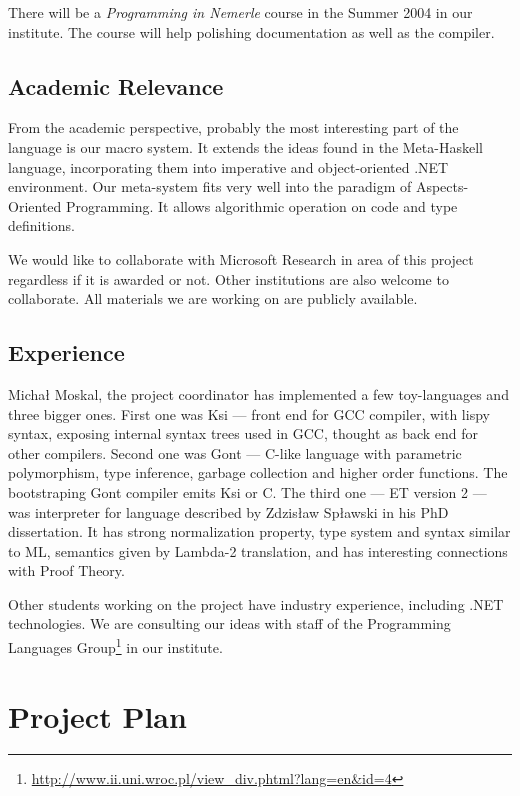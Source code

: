 \documentclass[a4paper,11pt]{article}
\begin{document}
There will be a \textit{Programming in Nemerle} course in the Summer
2004 in our institute.  The course will help polishing documentation as
well as the compiler.


\subsection{Academic Relevance}

From the academic perspective, probably the most interesting part of
the language is our macro system. It extends the ideas found in the
Meta-Haskell \cite{MetaHaskell} language, incorporating them into
imperative and object-oriented .NET environment. Our meta-system fits
very well into the paradigm of Aspects-Oriented Programming. It allows
algorithmic operation on code and type definitions.

We would like to collaborate with Microsoft Research in area of this
project regardless if it is awarded or not. Other institutions are also
welcome to collaborate. All materials we are working on are publicly
available.



\subsection{Experience}

Micha{\l} Moskal, the project coordinator has implemented a few
toy-languages and three bigger ones. First one was Ksi --- front end for
GCC compiler, with lispy syntax, exposing internal syntax trees used in
GCC, thought as back end for other compilers.  Second one was Gont ---
C-like language with parametric polymorphism, type inference, garbage
collection and higher order functions. The bootstraping Gont compiler
emits Ksi or C. The third one --- ET version 2 --- was interpreter for
language described by Zdzis{\l}aw Sp{\l}awski in his PhD dissertation.
It has strong normalization property, type system and syntax similar to ML,
semantics given by Lambda-2 translation, and has interesting connections
with Proof Theory.

Other students working on the project have industry experience, including
.NET technologies. We are consulting our ideas with staff of the Programming 
Languages 
Group\footnote{\url{http://www.ii.uni.wroc.pl/view_div.phtml?lang=en&id=4}}
in our institute.

\section{Project Plan}
\end{document}
